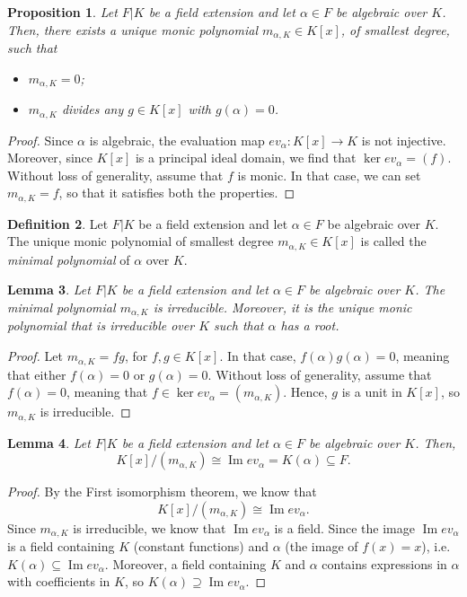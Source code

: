 \documentclass[a4paper, openany]{memoir}
\theoremstyle{definition}
\newtheorem{definition}{Definition}[section]
\theoremstyle{plain}
\newtheorem{lemma}[definition]{Lemma}
\newtheorem{proposition}[definition]{Proposition}
\begin{document}
    \begin{proposition}
        Let $F|K$ be a field extension and let $\alpha \in F$ be algebraic over $K$. Then, there exists a unique monic polynomial $m_{\alpha, K} \in K[x]$, of smallest degree, such that
        \begin{itemize}
            \item $m_{\alpha, K} = 0$;
            \item $m_{\alpha, K}$ divides any $g \in K[x]$ with $g(\alpha) = 0$.
        \end{itemize}
    \end{proposition}
    \begin{proof}
        Since $\alpha$ is algebraic, the evaluation map $ev_\alpha \colon K[x] \to K$ is not injective. Moreover, since $K[x]$ is a principal ideal domain, we find that $\ker ev_\alpha = (f)$. Without loss of generality, assume that $f$ is monic. In that case, we can set $m_{\alpha, K} = f$, so that it satisfies both the properties.
    \end{proof}

    \begin{definition}
        Let $F|K$ be a field extension and let $\alpha \in F$ be algebraic over $K$. The unique monic polynomial of smallest degree $m_{\alpha, K} \in K[x]$ is called the \emph{minimal polynomial} of $\alpha$ over $K$.
    \end{definition}

    \begin{lemma}
        Let $F|K$ be a field extension and let $\alpha \in F$ be algebraic over $K$. The minimal polynomial $m_{\alpha, K}$ is irreducible. Moreover, it is the unique monic polynomial that is irreducible over $K$ such that $\alpha$ has a root.
    \end{lemma}
    \begin{proof}
        Let $m_{\alpha, K} = fg$, for $f, g \in K[x]$. In that case, $f(\alpha) g(\alpha) = 0$, meaning that either $f(\alpha) = 0$ or $g(\alpha) = 0$. Without loss of generality, assume that $f(\alpha) = 0$, meaning that $f \in \ker ev_\alpha = (m_{\alpha, K})$. Hence, $g$ is a unit in $K[x]$, so $m_{\alpha, K}$ is irreducible.
    \end{proof}

    \begin{lemma}
        Let $F|K$ be a field extension and let $\alpha \in F$ be algebraic over $K$. Then,
        \[K[x]/(m_{\alpha, K}) \cong \operatorname{Im} ev_\alpha = K(\alpha) \subseteq F.\]
    \end{lemma}
    \begin{proof}
        By the First isomorphism theorem, we know that 
        \[K[x]/(m_{\alpha, K}) \cong \operatorname{Im} ev_\alpha.\]
        Since $m_{\alpha, K}$ is irreducible, we know that $\operatorname{Im} ev_\alpha$ is a field. Since the image $\operatorname{Im} ev_\alpha$ is a field containing $K$ (constant functions) and $\alpha$ (the image of $f(x) = x$), i.e. $K(\alpha) \subseteq \operatorname{Im} ev_\alpha$. Moreover, a field containing $K$ and $\alpha$ contains expressions in $\alpha$ with coefficients in $K$, so $K(\alpha) \supseteq \operatorname{Im} ev_\alpha$.
    \end{proof}
\end{document}
